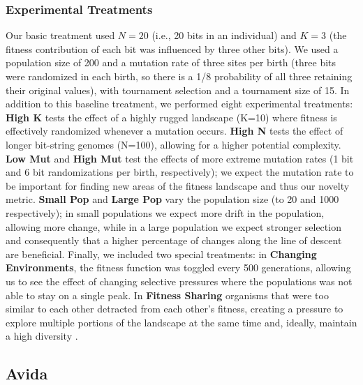 \documentclass[letterpaper]{article}
\begin{document}
\subsubsection{Experimental Treatments}
Our basic treatment used $N=20$ (i.e., 20 bits in an individual) and $K=3$ (the fitness contribution of each bit was influenced by three other bits).  We used a population size of 200 and a mutation rate of three sites per birth (three bits were randomized in each birth, so there is a 1/8 probability of all three retaining their original values), with tournament selection and a tournament size of 15.
In addition to this baseline
treatment, we performed eight experimental treatments: \textbf{High K} tests the effect of a highly rugged landscape (K=10) where fitness is effectively randomized whenever a mutation occurs.  \textbf{High N} tests the effect of longer bit-string genomes (N=100), allowing for a higher potential complexity.  \textbf{Low Mut} and \textbf{High Mut} test the effects of more extreme mutation rates (1 bit and 6 bit randomizations per birth, respectively); we expect the mutation rate to be important for finding new areas of the fitness landscape and thus our novelty metric.  \textbf{Small Pop} and \textbf{Large Pop} vary the population size (to 20 and 1000 respectively); in small populations we expect more drift in the population, allowing more change, while in a large population we expect stronger selection and consequently that a higher percentage of changes along the line of descent are beneficial.  Finally, we included two special treatments: in \textbf{Changing Environments}, the fitness function was toggled every 500 generations, allowing us to see the effect of changing selective pressures where the populations was not able to stay on a single peak.  In \textbf{Fitness Sharing} organisms that were too similar to each other detracted from each other's fitness, creating a pressure to explore multiple portions of the landscape at the same time and, ideally, maintain a high diversity  \citep{goldberg_genetic_1987}.

\subsection{Avida}
\end{document}
